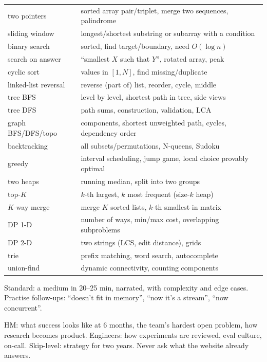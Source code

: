 \begin{mem}
\begin{tabularx}{\linewidth}{@{}lL@{}}
\toprule
two pointers & sorted array pair/triplet, merge two sequences, palindrome\\
sliding window & longest/shortest substring or subarray with a condition\\
binary search & sorted, find target/boundary, need $O(\log n)$\\
search on answer & ``smallest $X$ such that $Y$'', rotated array, peak\\
cyclic sort & values in $[1,N]$, find missing/duplicate\\
linked-list reversal & reverse (part of) list, reorder, cycle, middle\\
tree BFS & level by level, shortest path in tree, side views\\
tree DFS & path sums, construction, validation, LCA\\
graph BFS/DFS/topo & components, shortest unweighted path, cycles, dependency order\\
backtracking & all subsets/permutations, N-queens, Sudoku\\
greedy & interval scheduling, jump game, local choice provably optimal\\
two heaps & running median, split into two groups\\
top-$K$ & $k$-th largest, $k$ most frequent (size-$k$ heap)\\
$K$-way merge & merge $K$ sorted lists, $k$-th smallest in matrix\\
DP 1-D & number of ways, min/max cost, overlapping subproblems\\
DP 2-D & two strings (LCS, edit distance), grids\\
trie & prefix matching, word search, autocomplete\\
union-find & dynamic connectivity, counting components\\\bottomrule
\end{tabularx}\par\smallskip
{\scriptsize Standard: a medium in 20--25 min, narrated, with complexity and edge cases. Practise follow-ups: ``doesn't fit in memory'', ``now it's a stream'', ``now concurrent''.}
\end{mem}

\begin{trap}
HM: what success looks like at 6 months, the team's hardest open problem, how research becomes product. Engineers: how experiments are reviewed, eval culture, on-call. Skip-level: strategy for two years. Never ask what the website already answers.
\end{trap}
